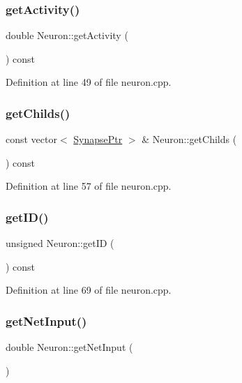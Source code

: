 \subsubsection{\texorpdfstring{get\+Activity()}{getActivity()}}
{\footnotesize\ttfamily double Neuron\+::get\+Activity (\begin{DoxyParamCaption}{ }\end{DoxyParamCaption}) const}



Definition at line 49 of file neuron.\+cpp.

\mbox{\label{class_neuron_a976fbbfd4fa7332a412901f8f9956967}} 
\subsubsection{\texorpdfstring{get\+Childs()}{getChilds()}}
{\footnotesize\ttfamily const vector$<$ \hyperlink{neural_network_8h_ac587b5c69519c070958c5cb318ddc50f}{Synapse\+Ptr} $>$ \& Neuron\+::get\+Childs (\begin{DoxyParamCaption}{ }\end{DoxyParamCaption}) const}



Definition at line 57 of file neuron.\+cpp.

\mbox{\label{class_neuron_a4844d18cf096e70569b21f0e45670520}} 
\subsubsection{\texorpdfstring{get\+I\+D()}{getID()}}
{\footnotesize\ttfamily unsigned Neuron\+::get\+ID (\begin{DoxyParamCaption}{ }\end{DoxyParamCaption}) const}



Definition at line 69 of file neuron.\+cpp.

\mbox{\label{class_neuron_a5a84194bf3f93051d3d9f02e9146f1d4}} 
\subsubsection{\texorpdfstring{get\+Net\+Input()}{getNetInput()}}
{\footnotesize\ttfamily double Neuron\+::get\+Net\+Input (\begin{DoxyParamCaption}{ }\end{DoxyParamCaption})}



